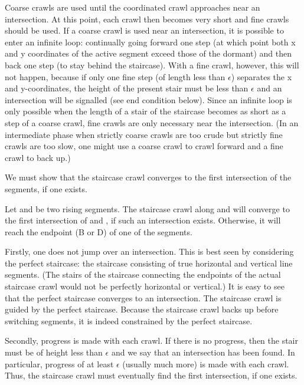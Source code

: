 Coarse crawls are used until the coordinated crawl approaches near an intersection.
At this point, each crawl then becomes very short and fine crawls should be used.
If a coarse crawl is used near an intersection, it is possible to enter an infinite loop:
continually going forward one step (at which point both x and y coordinates of the active segment
exceed those of the dormant) and then back one step (to stay behind the staircase).  
With a fine crawl, however, this will not happen, because if only one fine step (of length 
less than 
$\epsilon$) separates the x and y-coordinates, the height of the present stair must be less 
than $\epsilon$ and an intersection will be signalled (see end condition below).
Since an infinite loop is only possible when the length of a stair of the staircase becomes 
as short as a step of a coarse crawl, fine crawls are only necessary near the 
intersection.
(In an intermediate phase when strictly coarse crawls are too crude 
but strictly fine crawls are too slow, one might use a coarse crawl to crawl forward 
and a fine crawl to back up.)

We must show that the staircase crawl converges to the first intersection of the segments,
if one exists.

\begin{lemma}
\label{lem-converge}
Let  and  be two rising segments.
The staircase crawl along  and  will converge
to the first intersection of  and , if such an 
intersection exists.
Otherwise, it will reach the endpoint (B or D) of one of the segments.
\end{lemma}
Firstly, one does not jump over an intersection.
This is best seen by considering the perfect staircase: the staircase consisting of true
horizontal and vertical line segments. %
(The stairs of the staircase connecting the endpoints of the actual staircase crawl would not be
perfectly horizontal or vertical.)
It is easy to see that the perfect staircase converges to an intersection.
The staircase crawl is guided by the perfect staircase.
Because the staircase crawl backs up before switching segments, it is indeed constrained by 
the perfect staircase.

Secondly, progress is made with each crawl. 
If there is no progress, then the stair must
be of height less than $\epsilon$ and we say that an intersection has been found.
In particular, progress of at least $\epsilon$ (usually much more) is made with each crawl.
Thus, the staircase crawl must eventually find the first intersection, if one exists.
\QED

